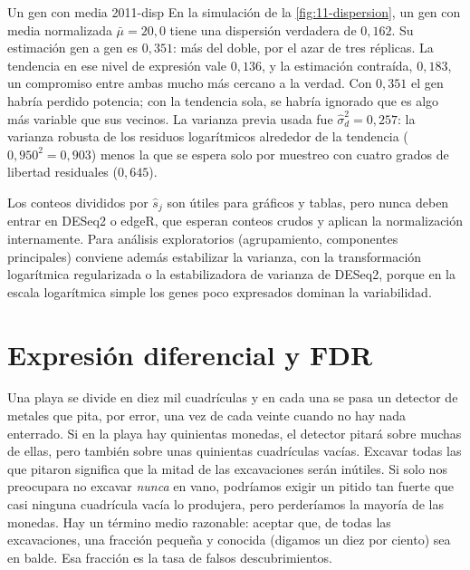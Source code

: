 \begin{ejemplo}{Un gen con media 20}{11-disp}
En la simulación de la \cref{fig:11-dispersion}, un gen con media normalizada $\bar\mu=20{,}0$ tiene una dispersión verdadera de $0{,}162$. Su estimación gen a gen es $0{,}351$: más del doble, por el azar de tres réplicas. La tendencia en ese nivel de expresión vale $0{,}136$, y la estimación contraída, $0{,}183$, un compromiso entre ambas mucho más cercano a la verdad. Con $0{,}351$ el gen habría perdido potencia; con la tendencia sola, se habría ignorado que es algo más variable que sus vecinos. La varianza previa usada fue $\hat\sigma_d^2=0{,}257$: la varianza robusta de los residuos logarítmicos alrededor de la tendencia ($0{,}950^2=0{,}903$) menos la que se espera solo por muestreo con cuatro grados de libertad residuales ($0{,}645$).
\end{ejemplo}

\begin{cuidado}
Los conteos divididos por $\hat s_j$ son útiles para gráficos y tablas, pero nunca deben entrar en DESeq2 o edgeR, que esperan conteos crudos y aplican la normalización internamente. Para análisis exploratorios (agrupamiento, componentes principales) conviene además estabilizar la varianza, con la transformación logarítmica regularizada o la estabilizadora de varianza de DESeq2, porque en la escala logarítmica simple los genes poco expresados dominan la variabilidad.
\end{cuidado}

\section{Expresión diferencial y FDR}\label{sec:11-de}

\begin{intuicion}
Una playa se divide en diez mil cuadrículas y en cada una se pasa un detector de metales que pita, por error, una vez de cada veinte cuando no hay nada enterrado. Si en la playa hay quinientas monedas, el detector pitará sobre muchas de ellas, pero también sobre unas quinientas cuadrículas vacías. Excavar todas las que pitaron significa que la mitad de las excavaciones serán inútiles. Si solo nos preocupara no excavar \emph{nunca} en vano, podríamos exigir un pitido tan fuerte que casi ninguna cuadrícula vacía lo produjera, pero perderíamos la mayoría de las monedas. Hay un término medio razonable: aceptar que, de todas las excavaciones, una fracción pequeña y conocida (digamos un diez por ciento) sea en balde. Esa fracción es la tasa de falsos descubrimientos.
\end{intuicion}

